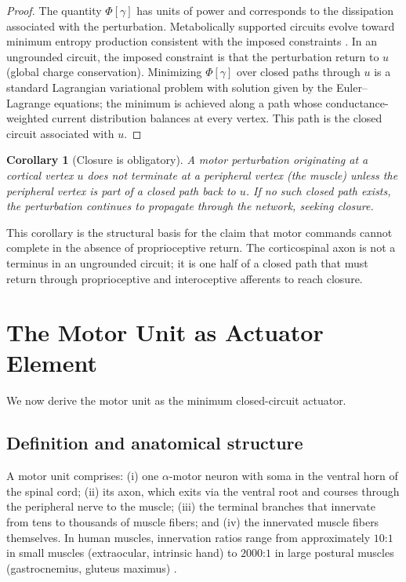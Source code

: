 \documentclass[11pt,twocolumn,a4paper]{article}
\newtheorem{corollary}[theorem]{Corollary}
\theoremstyle{definition}
\theoremstyle{remark}
\begin{document}
\begin{proof}
The quantity $\Phi[\gamma]$ has units of power and corresponds to the
dissipation associated with the perturbation. Metabolically supported
circuits evolve toward minimum entropy production consistent with
the imposed constraints \citep{onsager1931,prigogine1977}. In an
ungrounded circuit, the imposed constraint is that the perturbation
return to $u$ (global charge conservation). Minimizing $\Phi[\gamma]$
over closed paths through $u$ is a standard Lagrangian variational
problem with solution given by the Euler--Lagrange equations; the
minimum is achieved along a path whose conductance-weighted current
distribution balances at every vertex. This path is the closed circuit
associated with $u$.
\end{proof}

\begin{corollary}[Closure is obligatory]
\label{cor:closure-obligatory}
A motor perturbation originating at a cortical vertex $u$ does not
terminate at a peripheral vertex (the muscle) unless the peripheral
vertex is part of a closed path back to $u$. If no such closed path
exists, the perturbation continues to propagate through the network,
seeking closure.
\end{corollary}

This corollary is the structural basis for the claim that motor
commands cannot complete in the absence of proprioceptive return.
The corticospinal axon is not a terminus in an ungrounded circuit; it
is one half of a closed path that must return through proprioceptive
and interoceptive afferents to reach closure.


\section{The Motor Unit as Actuator Element}
\label{sec:motor-unit}

We now derive the motor unit as the minimum closed-circuit actuator.

\subsection{Definition and anatomical structure}

A motor unit comprises: (i) one $\alpha$-motor neuron with soma in the
ventral horn of the spinal cord; (ii) its axon, which exits via the
ventral root and courses through the peripheral nerve to the muscle;
(iii) the terminal branches that innervate from tens to thousands of
muscle fibers; and (iv) the innervated muscle fibers themselves. In
human muscles, innervation ratios range from approximately $10$:$1$
in small muscles (extraocular, intrinsic hand) to $2000$:$1$ in large
postural muscles (gastrocnemius, gluteus maximus)
\citep{buchthal1980,feinstein1955}.
\end{document}
